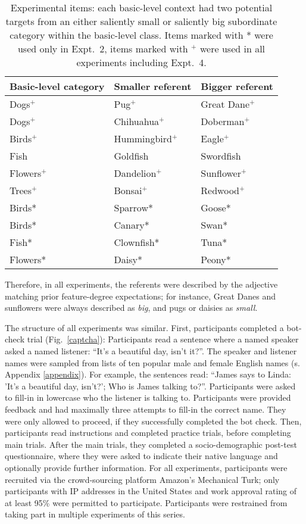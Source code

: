 \begin{table}[t]
		\begin{center}
			\caption{Experimental items: each basic-level context had two potential targets from an either saliently small or saliently big subordinate category within the basic-level class. Items marked with * were used only in Expt.~2, items marked with $^{+}$ were used in all experiments including Expt.~4.}
			\label{tab:stimuli}
			\vskip 0.12in
			\fontsize{10}{11}\selectfont
			\setlength{\extrarowheight}{.5em}
			\begin{tabularx}{\textwidth}{XXX}
				\hline
				Basic-level category & Smaller referent & Bigger referent\\
				\hline
				Dogs$^+$ & Pug$^+$ & Great Dane$^+$ \\
				Dogs$^+$ & Chihuahua$^+$ & Doberman$^+$\\
				Birds$^+$ & Hummingbird$^+$ & Eagle$^+$  \\
				Fish & Goldfish & Swordfish \\
				Flowers$^+$ & Dandelion$^+$ & Sunflower$^+$\\
				Trees$^+$ & Bonsai$^+$ & Redwood$^+$\\
				Birds* & Sparrow* & Goose* \\
				Birds* & Canary* & Swan* \\
				Fish* & Clownfish* & Tuna* \\
				Flowers* & Daisy* & Peony* \\
				\hline     
			\end{tabularx}
		\end{center}
\end{table}
Therefore, in all experiments, the referents were described by the adjective matching prior feature-degree expectations; for instance, Great Danes and sunflowers were always described as \textit{big}, and pugs or daisies as \textit{small}. 

The structure of all experiments was similar. First, participants completed a bot-check trial (Fig.~\ref{captcha}): Participants read a sentence where a named speaker asked a named listener: “It’s a beautiful day, isn’t it?”. The speaker and listener names were sampled from lists of ten popular male and female English names (s. Appendix \ref{appendix}). For example, the sentences read: “James says to Linda: 'It’s a beautiful day, isn’t?'; Who is James talking to?”.  Participants were asked to fill-in in lowercase who the listener is talking to. Participants were provided feedback and had maximally three attempts to fill-in the correct name. They were only allowed to proceed, if they successfully completed the bot check. Then, participants read instructions and completed practice trials, before completing main trials. After the main trials, they completed a socio-demographic post-test questionnaire, where they were asked to indicate their native language and optionally provide further information. 
For all experiments, participants were recruited via the crowd-sourcing platform Amazon’s Mechanical Turk; only participants with IP addresses in the United States and work approval rating of at least 95\% were permitted to participate. Participants were restrained from taking part in multiple experiments of this series.  

